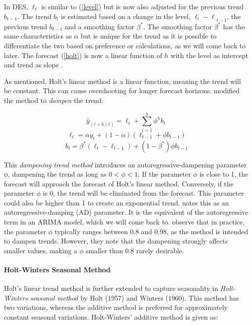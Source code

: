 \documentclass[12pt,a4paper]{article}
\begin{document}
In DES, $\ell_t$ is similar to (\ref{level}) but is now also adjusted for the previous trend $b_{t-1}$. The trend $b_t$ is estimated based on a change in the level, ${\ell_t-\ell}_{t-1}$, the previous trend $b_{t-1}$ and a smoothing factor $\beta^\ast$. The smoothing factor $\beta^\ast$ has the same characteristics as $\alpha$ but is unique for the trend as it is possible to differentiate the two based on preference or calculations, as we will come back to later. The forecast (\ref{holt}) is now a linear function of $h$ with the level as intercept and trend as slope \parencite{HyndmanForecasting2021}. 

As mentioned, Holt’s linear method is a linear function, meaning the trend will be constant. This can cause overshooting for longer forecast horizons. \cite{Gardner1985} modified the method to \textit{dampen} the trend:

\begin{equation}
  {\hat{y}}_{\left(t+h\middle| t\right)}=\ell_t+\sum_{i=1}^{h}\phi^hb_t\ 
  \label{holtwinter}
\end{equation}
\begin{equation}
  \ell_t=\alpha y_t+\left(1-\alpha\right)\left(\ell_{t-1}+\phi b_{t-1}\right)
  \label{levelholtwinter}
\end{equation}
\begin{equation}
  b_t=\beta^\ast\left(\ell_t-\ell_{t-1}\right)+\left(1-\beta^\ast\right)\phi b_{t-1}
  \label{trendholtwinter}
\end{equation}

This \textit{dampening trend method} introduces an autoregressive-dampening parameter $\phi$, dampening the trend as long as $0<\phi<1$. If the parameter $\phi$ is close to 1, the forecast will approach the forecast of Holt’s linear method. Conversely, if the parameter $\phi$ is 0, the trend will be eliminated from the forecast. This parameter could also be higher than 1 to create an exponential trend. \cite{Gardner1985} notes this as an autoregressive-damping (AD) parameter. It is the equivalent of the autoregressive term in an ARIMA model, which we will come back to. \cite{HyndmanForecasting2021} observe that in practice, the parameter $\phi$ typically ranges between 0.8 and 0.98, as the method is intended to dampen trends. However, they note that the dampening strongly affects smaller values, making a $\phi$ smaller than 0.8 rarely desirable.


\paragraph{Holt-Winters Seasonal Method}
Holt’s linear trend method is further extended to capture seasonality in \textit{Holt-Winters seasonal method} by Holt (1957) and Winters (1960). This method has two variations, whereas the additive method is preferred for approximately constant seasonal variations. Holt-Winters’ additive method is given as: 
\end{document}
